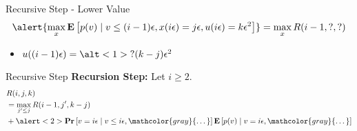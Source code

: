 \documentclass{beamer}
\begin{document}
\begin{frame}{Recursive Step - Lower Value}
  \begin{align*}
    \alert{\max_x\mathbf{E}\left[p(v) \mid v \leq (i - 1) \epsilon, x(i\epsilon) = j\epsilon, u(i\epsilon) = k\epsilon^2 \right]} = \max_x R(i-1, ?, ?)
  \end{align*}

  \begin{itemize}
    \item $u((i-1)\epsilon) = \alt<1>{?}{(k-j)\epsilon^2}$
  \end{itemize}
\end{frame}

\begin{frame}{Recursive Step}
  \textbf{Recursion Step:}
  Let $i \geq 2$.
  \begin{align*}
     & R(i,j,k)                                                                                                                                                                          \\
     & = \max_{j' \leq j} R(i-1, j', k-j)                                                                                                                                                \\
     & + \alert<2>{\mathbf{Pr}\left[v = i\epsilon \mid v \leq i \epsilon, \mathcolor{gray}{\dots} \right] \mathbf{E}\left[p(v) \mid v = i\epsilon, \mathcolor{gray}{\dots} \right]}
  \end{align*}
\end{frame}
\end{document}
